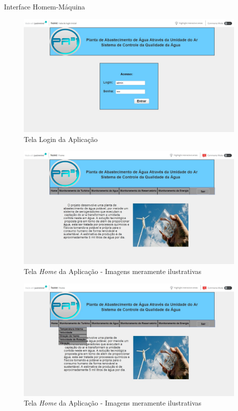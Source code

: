 \textual
\begin{center}
 {\large Interface Homem-Máquina}\\[0.2cm]
 

\begin{figure}[!ht]
\centering
\includegraphics[scale=0.45]{figuras/login}
\caption[Tela Login]{Tela Login da Aplicação}
\label{tela_login}
\end{figure}

 
\begin{figure}[!ht]
\centering
\includegraphics[scale=0.45]{figuras/home}
\caption[Home]{Tela \emph{Home} da Aplicação - Imagens meramente ilustrativas}
\label{tela_home}
\end{figure}
\clearpage

\begin{figure}[!ht]
\centering
\includegraphics[scale=0.45]{figuras/menu_monitoramento_da_turbina}
\caption[Home]{Tela \emph{Home} da Aplicação - Imagens meramente ilustrativas}
\label{tela_home}
\end{figure}



\end{center}
